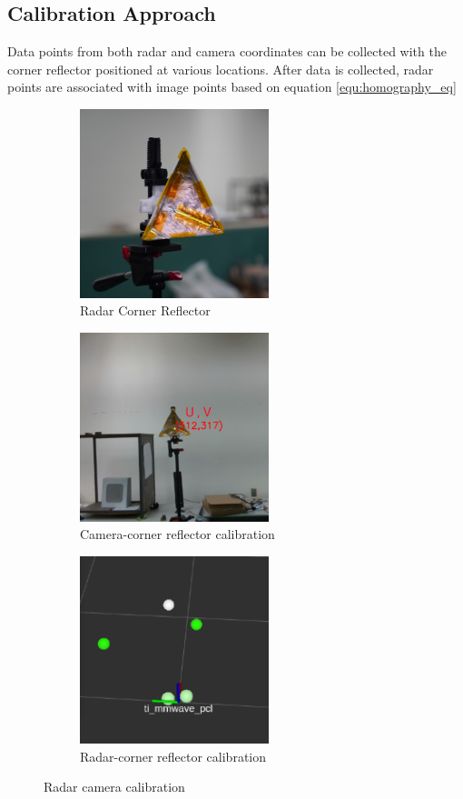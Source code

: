 \subsection{Calibration Approach}\label{subsec:2-1-data_collect}

Data points from both radar and camera coordinates can be collected with the corner reflector positioned at various locations.
After data is collected, radar points are associated with image points based on equation \ref*{equ:homography_eq}
\begin{figure}[hbpt]
    \centering
    \begin{subfigure}{0.25\linewidth}
        \includegraphics[width=5.5cm]{Figures/corner_reflector.jpg}
        \caption{Radar Corner Reflector}
        \label{subfig:corner_reflector_fig}
    \end{subfigure}
    \hfill
    \begin{subfigure}{0.25\linewidth}
        \centering
        \includegraphics[width=5.5cm]{Figures/camera_corner.png}
        \caption{Camera-corner reflector calibration}
        \label{subfig:camera_view_fig}
    \end{subfigure}
    \hfill
    \begin{subfigure}{0.25\linewidth}
        \centering
        \includegraphics[width=5.5cm]{Figures/radar_corner.png}
        \caption{Radar-corner reflector calibration}
        \label{subfig:radar_view_fig}
    \end{subfigure}

    \caption{Radar camera calibration}
    \label{fig:radar_camera_calibration}
\end{figure}
\newpage
